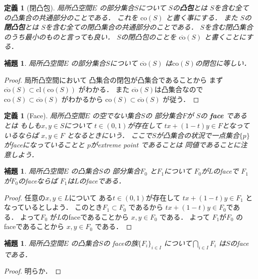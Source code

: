 \documentclass[leqno, a4paper, 12pt]{jsarticle}
\newtheorem{lem}[thm]{補題}
\newtheorem{df}[thm]{定義}
\newcommand{\cl}{\mathrm{cl}}
\newcommand{\mycco}[1]{\overline{\mathrm{co}}(#1)}
\newcommand{\myco}[1]{\mathrm{co}(#1)}
\begin{document}
\begin{df}[閉凸包]
局所凸空間$E$
の部分集合$S$について
$S$の\textbf{凸包}とは
$S$を含む全ての凸集合の共通部分のことである．
これを
$\myco{S}$
と書く事にする．
また
$S$の\textbf{閉凸包}とは
$S$を含む全ての閉凸集合の共通部分のことである．
$S$を含む閉凸集合のうち最小のものと言っても良い．
$S$の閉凸包のことを
$\mycco{S}$
と書くことにする．
\end{df}

\begin{lem}\label{lem:totutotu}
局所凸空間$E$
の部分集合$S$について
$\mycco{S}$
は$\myco{S}$の閉包に等しい．
\end{lem}
\begin{proof}
局所凸空間において
凸集合の閉包が凸集合であることから
まず
$\mycco{S}\subset \cl(\myco{S})$
がわかる．
また
$\mycco{S}$は凸集合なので
$\myco{S}\subset \mycco{S}$
がわかるから
$\myco{S}\subset \mycco{S}$
が従う．
\end{proof}

\begin{df}[Face]
局所凸空間$E$
の空でない集合$S$の
部分集合$F$が
$S$の
\textbf{face}
であるとは
もしも$x, y\in S$について
$t\in (0, 1)$が存在して
$tx+(1-t)y\in F$となっているならば
$x, y \in F$
となるときにいう．
ここで$S$が凸集合の状況で一点集合$\{p\}$がfaceになっていることと
$p$がextreme point であることは
同値であることに注意しよう．
\end{df}

\begin{lem}\label{lem:uuuuu}
局所凸空間$E$
の凸集合$S$の
部分集合$F_{0}$
と$F_{1}$について
$F_{0}$が$L$のfaceで
$F_{1}$が$F_{0}$のfaceならば
$F_{1}$は$L$のfaceである．
\end{lem}
\begin{proof}
任意の$x, y\in L$について
ある$t\in (0, 1)$が存在して
$tx+(1-t)y\in F_{1}$
となっているとしよう．
このとき$F_{1}\subset F_{0}$
であるから
$tx+(1-t)y\in F_{0}$である．
よって$F_{0}$
が$L$のfaceであることから
$x, y\in F_{0}$
である．
よって
$F_{1}$が$F_{0}$
のfaceであることから
$x, y\in F_{0}$
である．
\end{proof}

\begin{lem}\label{lem:intface}
局所凸空間$E$
の凸集合$S$の
faceの族$\{F_{i}\}_{i\in I}$
について$\bigcap_{i\in I}F_{i}$
は$S$のfaceである．
\end{lem}
\begin{proof}
明らか．
\end{proof}
\end{document}
